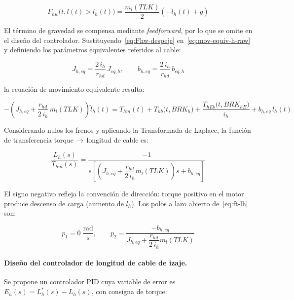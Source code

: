\documentclass[12pt, a4paper]{article}
\begin{document}
\begin{equation}
    \label{eq:Fhw-despeje}
    F_{hw}\!\bigl(t,l(t)>l_h(t)\bigr)
    = \frac{m_l(TLK)}{2}\!\left(-\ddot{l}_h(t)+g\right)
\end{equation}

El término de gravedad se compensa mediante \textit{feedforward}, por lo que se omite
en el diseño del controlador. Sustituyendo~\eqref{eq:Fhw-despeje} en~\eqref{eq:mov-equiv-h-raw}
y definiendo los parámetros equivalentes referidos al cable:

\begin{equation}
    \label{eq:Jheq-bheq}
    J_{h,eq} = \frac{2\,i_h}{r_{hd}}\,J_{eq,h},
    \qquad
    b_{h,eq} = \frac{2\,i_h}{r_{hd}}\,b_{eq,h}
\end{equation}

la ecuación de movimiento equivalente resulta:

\begin{equation}
    \label{eq:mov-equiv-h}
    -\!\left(J_{h,eq}+\frac{r_{hd}}{2\,i_h}\,m_l(TLK)\right)\ddot{l}_h(t)
    = T_{hm}(t)+T_{hb}\!\bigl(t,BRK_h\bigr)+\frac{T_{hEb}\!\bigl(t,BRK_{hE}\bigr)}{i_h}
      +b_{h,eq}\,\dot{l}_h(t)
\end{equation}

Considerando nulos los frenos y aplicando la Transformada de Laplace, la función de
transferencia torque\,$\to$\,longitud de cable es:

\begin{equation}
    \label{eq:ft-lh}
    \frac{L_h(s)}{T_{hm}(s)} =
    \frac{-1}{s\!\left[\left(J_{h,eq}+\dfrac{r_{hd}}{2\,i_h}m_l(TLK)\right)s
                        + b_{h,eq}\right]}
\end{equation}

El signo negativo refleja la convención de dirección: torque positivo en el motor
produce descenso de carga (aumento de $l_h$). Los polos a lazo abierto de~\eqref{eq:ft-lh} son:

\begin{equation}
    \label{eq:polos-LA-h}
    p_1 = 0\;\frac{\text{rad}}{\text{s}},
    \qquad
    p_2 = \frac{-b_{h,eq}}{J_{h,eq}+\dfrac{r_{hd}}{2\,i_h}m_l(TLK)}
\end{equation}

\paragraph{Diseño del controlador de longitud de cable de izaje.}

Se propone un controlador PID cuya variable de error es
$E_h(s) = L_h^*(s) - L_h(s)$, con consigna de torque:
\end{document}
